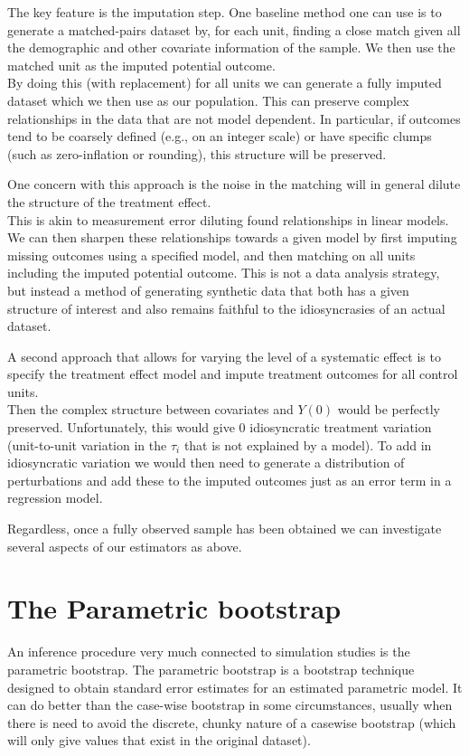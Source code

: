 \documentclass[
]{book}
\begin{document}
The key feature is the imputation step.
One baseline method one can use is to generate a matched-pairs dataset by, for each unit, finding a close match given all the demographic and other covariate information of the sample. We then use the matched unit as the imputed potential outcome.\\
By doing this (with replacement) for all units we can generate a fully imputed dataset which we then use as our population.
This can preserve complex relationships in the data that are not model dependent.
In particular, if outcomes tend to be coarsely defined (e.g., on an integer scale) or have specific clumps (such as zero-inflation or rounding), this structure will be preserved.

One concern with this approach is the noise in the matching will in general dilute the structure of the treatment effect.\\
This is akin to measurement error diluting found relationships in linear models.
We can then sharpen these relationships towards a given model by first imputing missing outcomes using a specified model, and then matching on all units including the imputed potential outcome.
This is not a data analysis strategy, but instead a method of generating synthetic data that both has a given structure of interest and also remains faithful to the idiosyncrasies of an actual dataset.

A second approach that allows for varying the level of a systematic effect is to specify the treatment effect model and impute treatment outcomes for all control units.\\
Then the complex structure between covariates and \(Y(0)\) would be perfectly preserved.
Unfortunately, this would give 0 idiosyncratic treatment variation (unit-to-unit variation in the \(\tau_i\) that is not explained by a model).
To add in idiosyncratic variation we would then need to generate a distribution of perturbations and add these to the imputed outcomes just as an error term in a regression model.

Regardless, once a fully observed sample has been obtained we can investigate several aspects of our estimators as above.

\hypertarget{the-parametric-bootstrap}{%
\chapter{The Parametric bootstrap}\label{the-parametric-bootstrap}}

An inference procedure very much connected to simulation studies is the parametric bootstrap.
The parametric bootstrap is a bootstrap technique designed to obtain standard error estimates for an estimated parametric model.
It can do better than the case-wise bootstrap in some circumstances, usually when there is need to avoid the discrete, chunky nature of a casewise bootstrap (which will only give values that exist in the original dataset).
\end{document}
